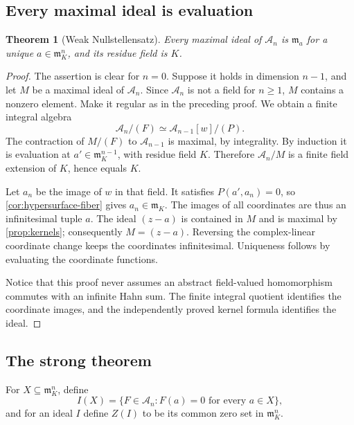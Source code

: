 \documentclass[11pt,letterpaper]{article}
\newtheorem{theorem}{Theorem}[section]
\theoremstyle{definition}
\theoremstyle{remark}
\newcommand{\A}{\mathscr A}
\newcommand{\m}{\mathfrak m}
\numberwithin{equation}{section}
\begin{document}
\subsection{Every maximal ideal is evaluation}
\begin{theorem}[Weak Nullstellensatz]\label{thm:weak-null}
Every maximal ideal of $\A_n$ is $\m_a$ for a unique $a\in\m_K^n$, and its residue field is $K$.
\end{theorem}
\begin{proof}
The assertion is clear for $n=0$. Suppose it holds in dimension $n-1$, and let $M$ be a maximal ideal of $\A_n$. Since $\A_n$ is not a field for $n\ge1$, $M$ contains a nonzero element. Make it regular as in the preceding proof. We obtain a finite integral algebra
\[
 \A_n/(F)\simeq\A_{n-1}[w]/(P).
\]
The contraction of $M/(F)$ to $\A_{n-1}$ is maximal, by integrality. By induction it is evaluation at $a'\in\m_K^{n-1}$, with residue field $K$. Therefore $\A_n/M$ is a finite field extension of $K$, hence equals $K$.

Let $a_n$ be the image of $w$ in that field. It satisfies $P(a',a_n)=0$, so \cref{cor:hypersurface-fiber} gives $a_n\in\m_K$. The images of all coordinates are thus an infinitesimal tuple $a$. The ideal $(z-a)$ is contained in $M$ and is maximal by \cref{prop:kernels}; consequently $M=(z-a)$. Reversing the complex-linear coordinate change keeps the coordinates infinitesimal. Uniqueness follows by evaluating the coordinate functions.

Notice that this proof never assumes an abstract field-valued homomorphism commutes with an infinite Hahn sum. The finite integral quotient identifies the coordinate images, and the independently proved kernel formula identifies the ideal.
\end{proof}

\subsection{The strong theorem}
For $X\subseteq\m_K^n$, define
\[
 I(X)=\{F\in\A_n:F(a)=0\text{ for every }a\in X\},
\]
and for an ideal $I$ define $Z(I)$ to be its common zero set in $\m_K^n$.
\end{document}
